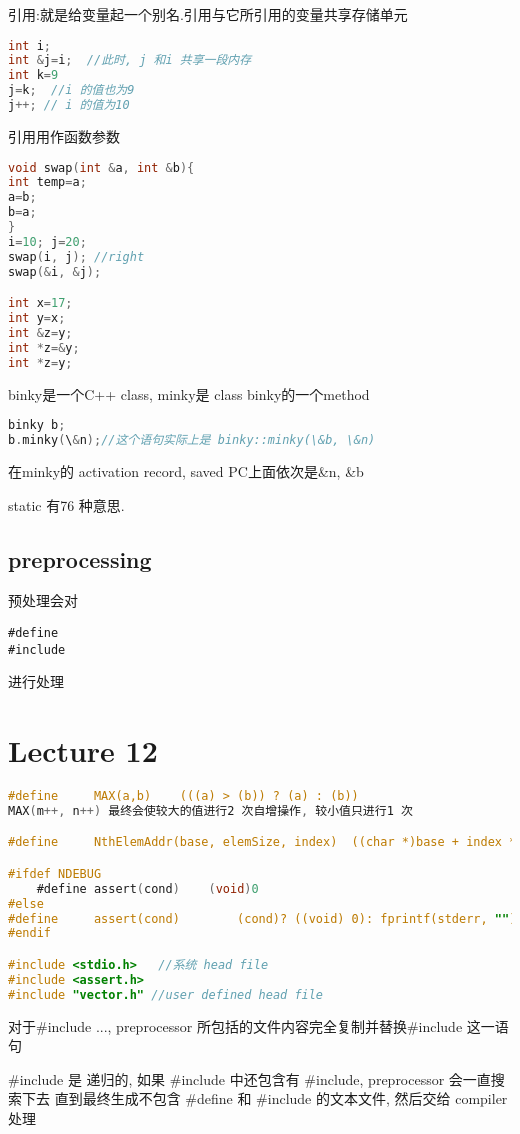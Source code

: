 \documentclass{article}
\begin{document}
引用:就是给变量起一个别名.引用与它所引用的变量共享存储单元
\begin{lstlisting}[language = C]
int i;
int &j=i;  //此时, j 和i 共享一段内存
int k=9
j=k;  //i 的值也为9
j++; // i 的值为10
\end{lstlisting}

引用用作函数参数
\begin{lstlisting}[language = C]
void swap(int &a, int &b){
int temp=a;
a=b;
b=a;
}
i=10; j=20;
swap(i, j); //right
swap(&i, &j);

int x=17;
int y=x;
int &z=y;
int *z=&y;
int *z=y;
\end{lstlisting}

binky是一个C++ class, minky是 class binky的一个method
\begin{lstlisting}[language = C]
binky b;
b.minky(\&n);//这个语句实际上是 binky::minky(\&b, \&n)
\end{lstlisting}
在minky的 activation record, saved PC上面依次是\&n, \&b

static 有76 种意思.

\subsection{preprocessing}
预处理会对
\begin{verbatim}
#define
#include
\end{verbatim}
进行处理

\section{Lecture 12}
\begin{lstlisting}[language = C]
#define 	MAX(a,b)	(((a) > (b)) ? (a) : (b))
MAX(m++, n++) 最终会使较大的值进行2 次自增操作, 较小值只进行1 次

#define 	NthElemAddr(base, elemSize, index) 	((char *)base + index * elemSize)

#ifdef NDEBUG
	#define assert(cond)	(void)0
#else
#define		assert(cond) 		(cond)? ((void) 0): fprintf(stderr, ""), exit(0)
#endif

#include <stdio.h>   //系统 head file
#include <assert.h>
#include "vector.h" //user defined head file
\end{lstlisting}
对于\#include ..., preprocessor 所包括的文件内容完全复制并替换\#include  这一语句

\#include 是 递归的, 如果 \#include 中还包含有 \#include, preprocessor 会一直搜索下去
直到最终生成不包含 \#define 和 \#include 的文本文件, 然后交给 compiler 处理
\end{document}
